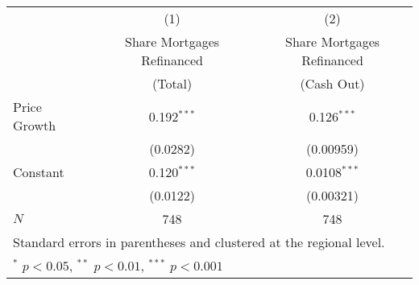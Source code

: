 \begin{tabular}{lcc}
\hline\hline
&\multicolumn{1}{c}{(1)}&\multicolumn{1}{c}{(2)}\\
& Share Mortgages Refinanced   & Share Mortgages Refinanced \\
& (Total) & (Cash Out) \\ 
\hline
Price Growth  &       0.192$^{***}$	&       0.126$^{***}$\\
            			&    (0.0282)         		&   (0.00959)         \\
Constant      	&       0.120$^{***}$	&      0.0108$^{***}$\\
            			&    (0.0122)         		&   (0.00321)         \\
\hline
\(N\)       		&   748         				&    748         \\
\hline\hline
\multicolumn{3}{l}{\footnotesize Standard errors in parentheses and clustered at the regional level.}\\
\multicolumn{3}{l}{\footnotesize $^*$ \(p<0.05\), $^{**}$ \(p<0.01\), $^{***}$ \(p<0.001\)}\\
\end{tabular}

